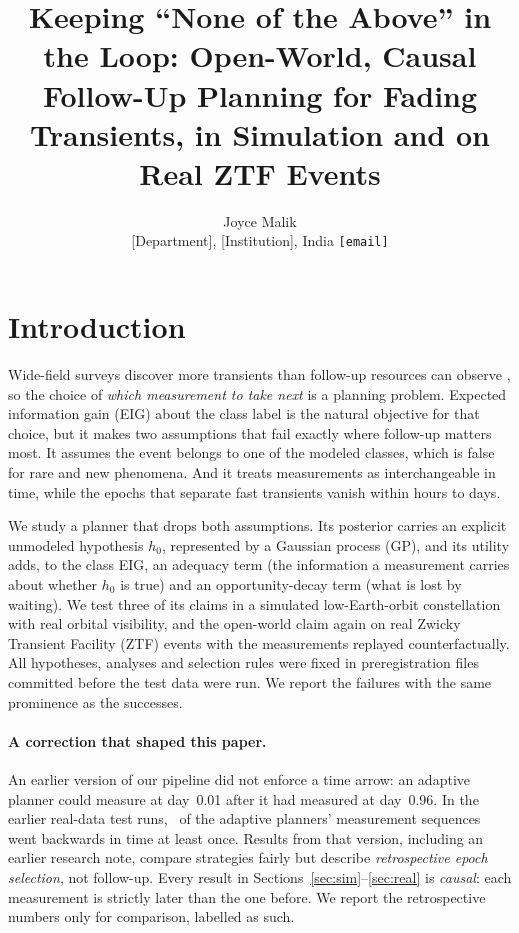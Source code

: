 \documentclass[10pt,twocolumn]{article}
\title{Keeping ``None of the Above'' in the Loop: Open-World, Causal Follow-Up Planning for Fading Transients, in Simulation and on Real ZTF Events}
\author{Joyce Malik\\ \small [Department], [Institution], India \quad \texttt{[email]}}
\date{}
\begin{document}
\maketitle



\section{Introduction}
Wide-field surveys discover more transients than follow-up resources can observe \citep{Bellm2019,Ivezic2019}, so the choice of \emph{which measurement to take next} is a planning problem. Expected information gain (EIG) about the class label \citep{Lindley1956,Chaloner1995} is the natural objective for that choice, but it makes two assumptions that fail exactly where follow-up matters most. It assumes the event belongs to one of the modeled classes, which is false for rare and new phenomena. And it treats measurements as interchangeable in time, while the epochs that separate fast transients vanish within hours to days.

We study a planner that drops both assumptions. Its posterior carries an explicit unmodeled hypothesis $h_0$, represented by a Gaussian process (GP), and its utility adds, to the class EIG, an adequacy term (the information a measurement carries about whether $h_0$ is true) and an opportunity-decay term (what is lost by waiting). We test three of its claims in a simulated low-Earth-orbit constellation with real orbital visibility, and the open-world claim again on real Zwicky Transient Facility (ZTF) events with the measurements replayed counterfactually. All hypotheses, analyses and selection rules were fixed in preregistration files committed before the test data were run. We report the failures with the same prominence as the successes.

\paragraph{A correction that shaped this paper.} An earlier version of our pipeline did not enforce a time arrow: an adaptive planner could measure at day~0.01 after it had measured at day~0.96. In the earlier real-data test runs, \CausalBugPct\ of the adaptive planners' measurement sequences went backwards in time at least once. Results from that version, including an earlier research note, compare strategies fairly but describe \emph{retrospective epoch selection}, not follow-up. Every result in Sections~\ref{sec:sim}--\ref{sec:real} is \emph{causal}: each measurement is strictly later than the one before. We report the retrospective numbers only for comparison, labelled as such.
\end{document}
